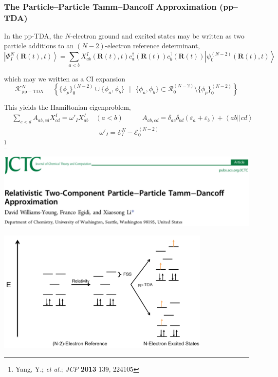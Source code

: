 \documentclass[usepdftitle=false,10pt]{beamer}
\newcommand{\ket}[1]{\left\vert #1 \right\rangle}         %
\newcommand{\innerop}[3]{\left\langle #1 \left\vert #2 \right\vert #3 \right\rangle}  %
\newcommand*\suchthat[0]{\text{ }\vert\text{ }}
\newcommand*\vc[1]{\boldsymbol{#1}}
\newcommand\blfootnote[1]{%
  \begingroup
  \renewcommand\thefootnote{}\footnote{#1}%
  \addtocounter{footnote}{-1}%
  \endgroup
}
\begin{document}
\begin{frame}
  \frametitle{The Particle--Particle Tamm--Dancoff Approximation (pp--TDA)}
  
  In the pp-TDA, the $N$-electron ground and excited states may be written as two
  particle additions to an $(N-2)$-electron reference determinant,
  \begin{equation*}
    \ket{\Phi_I^N (\vc{R}(t),t)} = \sum_{a < b} X_{ab}^I(\vc{R}(t),t)
    c_a^\dagger(\vc{R}(t)) c_b^\dagger (\vc{R}(t))
    \ket{\psi_0^{(N-2)}(\vc{R}(t),t)}
  \end{equation*}

  which may we written as a CI expansion
  \begin{equation*}
    \mathcal{K}_\mathrm{pp-TDA}^N =
    \left\lbrace \{ \phi_p \}^{(N-2)}_0 \cup \{\phi_a,\phi_b \} \suchthat 
    \{ \phi_a,\phi_b \} \subset \mathcal{R}^{(N-2)}_0 \setminus \{\phi_p \}^{(N-2)}_0 
    \right\rbrace
  \end{equation*}

  This yields the Hamiltonian eigenproblem,
  \begin{align*}
    &\sum_{c < d} A_{ab,cd} X_{cd}^I = \omega'_I X_{ab}^I \quad (a < b) \qquad
    &A_{ab,cd} = \delta_{ac}\delta_{bd}(\varepsilon_a + \varepsilon_b) + 
      \innerop{ab}{}{cd}
  \end{align*}
  \begin{align*}
    &\omega'_I = \mathcal{E}^{N}_I - \mathcal{E}^{(N-2)}_0
  \end{align*}
  \blfootnote{\tiny Yang, Y.; \emph{et al.}; \emph{JCP} \textbf{2013} 139, 224105}
\end{frame}

\begin{frame}
  \begin{center}
    \includegraphics[width=\textwidth,height=0.32\textheight]{ppX2CTop} 

    \includegraphics[width=0.8\textwidth]{ppX2C_TOC} 
  \end{center}
\end{frame}
\end{document}
